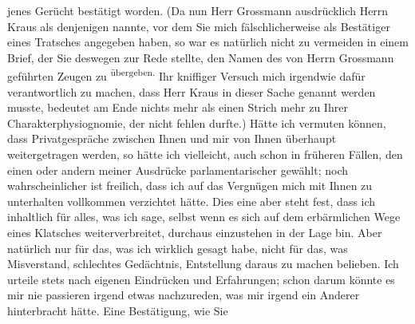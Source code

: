 \begin{ledgroupsized}[t]{13cm}
               jenes Gerücht bestätigt worden. (Da nun Herr Grossmann ausdrücklich Herrn Kraus
               als denjenigen nannte, vor dem Sie mich fälschlicherweise als Bestätiger eines
               Tratsches angegeben haben, so war es natürlich nicht zu vermeiden in einem Brief, der
               Sie deswegen zur Rede stellte, den Namen des von Herrn Grossmann geführten Zeugen zu \substVorne{}\textsuperscript{übergeben.}{\allowbreak}\substDazwischen{}\label{T_L02019-1v}\label{T_L02019-1h}\substHinten{}\pend
           \pstart
           Ihr kniffiger Versuch mich irgendwie dafür verantwortlich zu machen, dass Herr Kraus in dieser Sache genannt werden musste,
               bedeutet am Ende nichts mehr als einen Strich mehr zu Ihrer Charakterphysiognomie,
               der nicht fehlen durfte.) Hätte ich vermuten können, dass Privatgespräche zwischen
               Ihnen und mir von Ihnen überhaupt weitergetragen werden, so hätte ich vielleicht,
               auch schon in früheren Fällen, den einen oder
               andern meiner Ausdrücke parlamentarischer gewählt; noch wahrscheinlicher ist
               freilich, dass ich auf das Vergnügen mich mit Ihnen zu unterhalten vollkommen
               verzichtet hätte. Dies eine aber steht fest, dass ich inhaltlich für alles, was ich
               sage, selbst wenn es {\pb}sich auf dem erbärmlichen Wege eines
               Klatsches weiterverbreitet, durchaus einzustehen in der Lage bin. Aber natürlich nur
               für das, was ich wirklich gesagt habe, nicht für das, was Misverstand, schlechtes
               Gedächtnis, Entstellung daraus zu machen belieben. Ich urteile stets nach eigenen
               Eindrücken und Erfahrungen; schon darum könnte es mir nie passieren irgend etwas
               nachzureden, was mir irgend ein Anderer hinterbracht hätte. Eine Bestätigung, wie Sie

\end{ledgroupsized}
